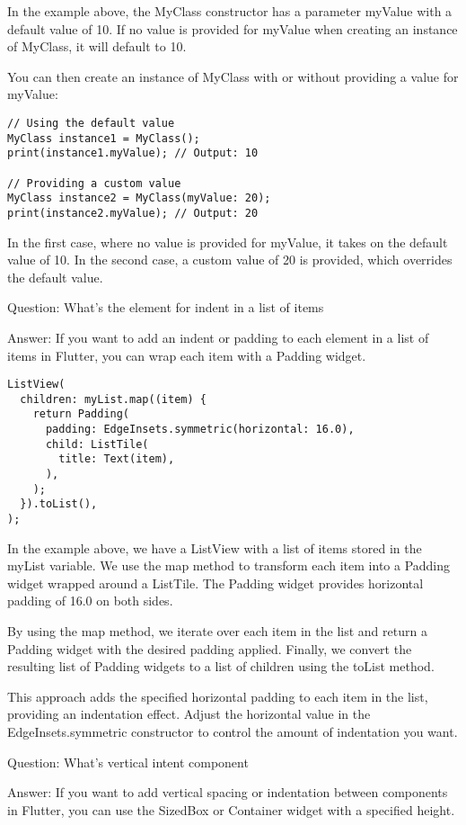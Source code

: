 In the example above, the MyClass constructor has a parameter myValue with a default value of 10. 
If no value is provided for myValue when creating an instance of MyClass, it will default to 10.

You can then create an instance of MyClass with or without providing a value for myValue:

\begin{lstlisting}
// Using the default value
MyClass instance1 = MyClass();
print(instance1.myValue); // Output: 10

// Providing a custom value
MyClass instance2 = MyClass(myValue: 20);
print(instance2.myValue); // Output: 20    
\end{lstlisting}

In the first case, where no value is provided for myValue, it takes on the default value of 10. In the second case, 
a custom value of 20 is provided, which overrides the default value.


Question: What's the element for indent in a list of items

Answer: If you want to add an indent or padding to each element in a list of items in Flutter, you can 
wrap each item with a Padding widget.

\begin{lstlisting}
ListView(
  children: myList.map((item) {
    return Padding(
      padding: EdgeInsets.symmetric(horizontal: 16.0),
      child: ListTile(
        title: Text(item),
      ),
    );
  }).toList(),
);
\end{lstlisting}

In the example above, we have a ListView with a list of items stored in the myList variable. We use the map 
method to transform each item into a Padding widget wrapped around a ListTile. The Padding widget provides 
horizontal padding of 16.0 on both sides.

By using the map method, we iterate over each item in the list and return a Padding widget with the desired 
padding applied. Finally, we convert the resulting list of Padding widgets to a list of children using the 
toList method.

This approach adds the specified horizontal padding to each item in the list, providing an indentation effect. 
Adjust the horizontal value in the EdgeInsets.symmetric constructor to control the amount of indentation you want.


Question: What's vertical intent component

Answer: If you want to add vertical spacing or indentation between components in Flutter, you can use the 
SizedBox or Container widget with a specified height. 

